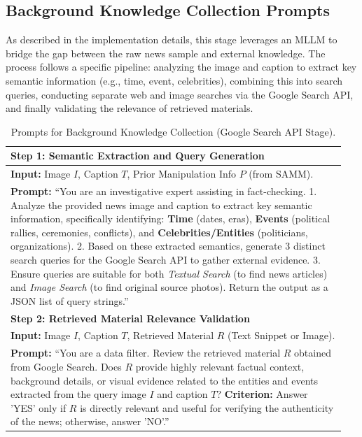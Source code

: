 \documentclass{article}
\theoremstyle{plain}
\theoremstyle{definition}
\theoremstyle{remark}
\begin{document}
\subsection{Background Knowledge Collection Prompts}
As described in the implementation details, this stage leverages an MLLM to bridge the gap between the raw news sample and external knowledge. The process follows a specific pipeline: analyzing the image and caption to extract key semantic information (e.g., time, event, celebrities), combining this into search queries, conducting separate web and image searches via the Google Search API, and finally validating the relevance of retrieved materials.

\begin{table}[H]
    \centering
    \caption{Prompts for Background Knowledge Collection (Google Search API Stage).}
    \label{tab:prompt_background}
    \begin{tabular}{p{0.95\linewidth}}
        \toprule
        \textbf{Step 1: Semantic Extraction and Query Generation} \\
        \midrule
        \textbf{Input:} Image $I$, Caption $T$, Prior Manipulation Info $P$ (from SAMM). \\
        \textbf{Prompt:} ``You are an investigative expert assisting in fact-checking. 
        1. Analyze the provided news image and caption to extract key semantic information, specifically identifying: \textbf{Time} (dates, eras), \textbf{Events} (political rallies, ceremonies, conflicts), and \textbf{Celebrities/Entities} (politicians, organizations).
        2. Based on these extracted semantics, generate 3 distinct search queries for the Google Search API to gather external evidence. 
        3. Ensure queries are suitable for both \textit{Textual Search} (to find news articles) and \textit{Image Search} (to find original source photos).
        Return the output as a JSON list of query strings.'' \\
        \midrule
        \textbf{Step 2: Retrieved Material Relevance Validation} \\
        \midrule
        \textbf{Input:} Image $I$, Caption $T$, Retrieved Material $R$ (Text Snippet or Image). \\
        \textbf{Prompt:} ``You are a data filter. Review the retrieved material $R$ obtained from Google Search. Does $R$ provide highly relevant factual context, background details, or visual evidence related to the entities and events extracted from the query image $I$ and caption $T$? 
        \textbf{Criterion:} Answer 'YES' only if $R$ is directly relevant and useful for verifying the authenticity of the news; otherwise, answer 'NO'.'' \\
        \bottomrule
    \end{tabular}
\end{table}
\end{document}
